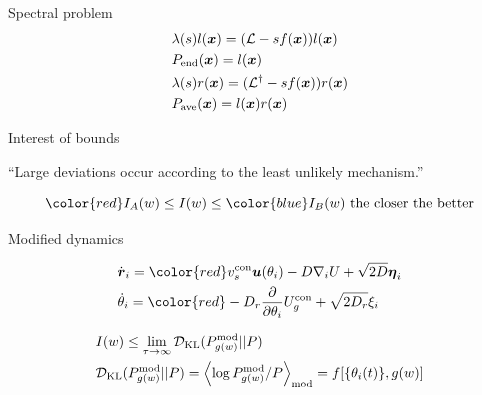 \documentclass{beamer}
\begin{document}
{\begin{frame}[noframenumbering]{Spectral problem}
\begin{eqnarray}
&\lambda(s) l(\boldsymbol{x}) = (\mathcal{L} - s f(\boldsymbol{x})) l(\boldsymbol{x})\\
&P_{\rm end}(\boldsymbol{x}) = l(\boldsymbol{x})\\
&\lambda(s) r(\boldsymbol{x}) = (\mathcal{L}^{\dagger} - s f(\boldsymbol{x})) r(\boldsymbol{x})\\
&P_{\rm ave}(\boldsymbol{x}) = l(\boldsymbol{x}) r(\boldsymbol{x})
\end{eqnarray}

\end{frame}

\begin{frame}[noframenumbering]{Interest of bounds}


\begin{center}
``Large deviations occur according to the least unlikely mechanism.''
\end{center}

\return
\begin{equation}
{\color{red} I_A}(w) \leq I(w) \leq {\color{blue} I_B}(w) \text{ the closer the better}
\end{equation}

\end{frame}

\begin{frame}[noframenumbering]{Modified dynamics}

\begin{eqnarray}
&\dot{\boldsymbol{r}}_i = {\color{red} v_s^{\rm con}} \boldsymbol{u}(\theta_i) - D \nabla_i U + \sqrt{2 D} \boldsymbol{\eta}_i\\
&\dot{\theta}_i = {\color{red}- D_r \frac{\partial}{\partial \theta_i} U^{\rm con}_g} + \sqrt{2 D_r} \xi_i
\end{eqnarray}


\begin{eqnarray}
&I(w) \leq \lim_{\tau \to \infty} \mathcal{D}_{\rm KL}(P^{\rm mod}_{g(w)} || P)\\
&\mathcal{D}_{\rm KL}(P^{\rm mod}_{g(w)} || P) = \left<\log P^{\rm mod}_{g(w)} / P\right>_{\rm mod} = f[\{\theta_i(t)\}, g(w)]
\end{eqnarray}


\end{frame}}
\end{document}
